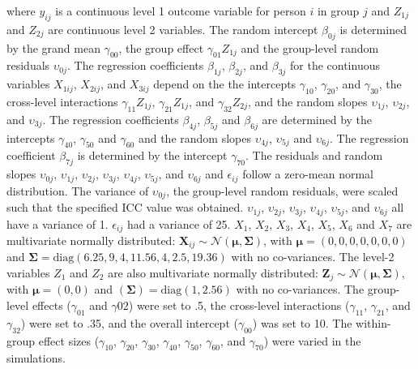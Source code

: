 \documentclass[10pt, a4paper, titlepage]{article}
\begin{document}
where $y_{ij}$ is a continuous level 1 outcome variable for person $i$ in group $j$ and $Z_{1j}$ and $Z_{2j}$ are continuous level 2 variables. The random intercept $\beta_{0j}$ is determined by the grand mean $\gamma_{00}$, the group effect $\gamma_{01}Z_{1j}$ and the group-level random residuals $\upsilon_{0j}$. The regression coefficients $\beta_{1j}$, $\beta_{2j}$, and $\beta_{3j}$ for the continuous variables $X_{1ij}$, $X_{2ij}$, and $X_{3ij}$ depend on the the intercepts $\gamma_{10}$, $\gamma_{20}$, and $\gamma_{30}$, the cross-level interactions $\gamma_{11}Z_{1j}$, $\gamma_{21}Z_{1j}$, and $\gamma_{32}Z_{2j}$, and the random slopes $\upsilon_{1j}$, $\upsilon_{2j}$, and $\upsilon_{3j}$. The regression coefficients $\beta_{4j}$, $\beta_{5j}$ and $\beta_{6j}$ are determined by the intercepts $\gamma_{40}$, $\gamma_{50}$ and $\gamma_{60}$ and the random slopes $\upsilon_{4j}$, $\upsilon_{5j}$ and $\upsilon_{6j}$. The regression coefficient $\beta_{7j}$ is determined by the intercept $\gamma_{70}$. The residuals and random slopes $\upsilon_{0j}$, $\upsilon_{1j}$, $\upsilon_{2j}$, $\upsilon_{3j}$, $\upsilon_{4j}$, $\upsilon_{5j}$, and $\upsilon_{6j}$ and $\epsilon_{ij}$ follow a zero-mean normal distribution. The variance of $\upsilon_{0j}$, the group-level random residuals, were scaled such that the specified ICC value was obtained. $\upsilon_{1j}$, $\upsilon_{2j}$, $\upsilon_{3j}$, $\upsilon_{4j}$, $\upsilon_{5j}$, and $\upsilon_{6j}$ all have a variance of 1. $\epsilon_{ij}$ had a variance of 25. $X_1$, $X_2$, $X_3$, $X_4$, $X_5$, $X_6$ and $X_7$ are multivariate normally distributed: $\mathbf{X}_{ij} \sim \mathcal{N}(\boldsymbol{\mu}, \boldsymbol{\Sigma})$, with $\boldsymbol{\mu} = (0, 0, 0, 0, 0, 0, 0)$ and $\boldsymbol{\Sigma} = \text{diag}(6.25, 9, 4, 11.56, 4, 2.5, 19.36)$ with no co-variances. The level-2 variables $Z_1$ and $Z_2$ are also multivariate normally distributed:  $\mathbf{Z}_{j} \sim \mathcal{N}(\boldsymbol{\mu}, \boldsymbol{\Sigma})$, with $\boldsymbol{\mu} = (0, 0)$ and $(\boldsymbol{\Sigma}) = \text{diag}(1, 2.56)$ with no co-variances. The group-level effects ($\gamma_{01}$ and $\gamma{02}$) were set to .5, the cross-level interactions ($\gamma_{11}$, $\gamma_{21}$, and $\gamma_{32}$) were set to .35, and the overall intercept ($\gamma_{00}$) was set to 10. The within-group effect sizes ($\gamma_{10}$, $\gamma_{20}$, $\gamma_{30}$, $\gamma_{40}$, $\gamma_{50}$, $\gamma_{60}$, and $\gamma_{70}$) were varied in the simulations.
\end{document}
